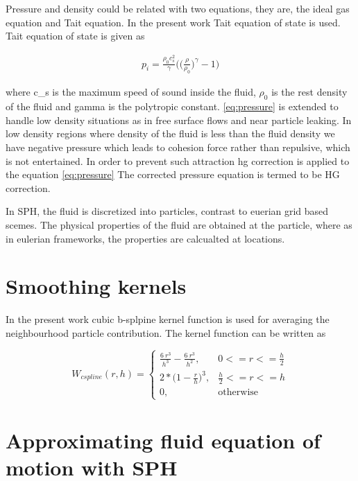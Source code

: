 Pressure and density could be related with two equations, they are, the ideal gas equation
and Tait equation. In the present work Tait equation of state is used. Tait equation of
state is given as

\begin{align}
  \label{eq:pressure}
  p_i = \frac{\rho_0 c_s^2 }{\gamma} \bigg(\bigg(\frac{\rho}{\rho_0}\bigg)^\gamma - 1 \bigg)
\end{align}

where c_s is the maximum speed of sound inside the fluid, $\rho_0$ is
the rest density of the fluid and gamma is the polytropic constant.
\eqref{eq:pressure} is extended to handle low density situations as in
free surface flows and near particle leaking. In low density regions
where density of the fluid is less than the fluid density we have
negative pressure which leads to cohesion force rather than repulsive,
which is not entertained. In order to prevent such attraction hg
correction is applied to the equation \eqref{eq:pressure} The corrected
pressure equation is termed to be HG correction.





In SPH, the fluid is discretized into particles, contrast to euerian
grid based scemes. The physical properties of the fluid are obtained
at the particle, where as in eulerian frameworks, the properties are
calcualted at locations.


\section{Smoothing kernels}
\label{sec:sk}


In the present work cubic b-splpine kernel function is used
for averaging the neighbourhood particle contribution. The kernel
function can be written as

\[
  W_{cspline}(r, h) =
  \begin{cases}
    \frac{6 \> r^3}{h^3} - \frac{6 \> r^3}{h^2}, & 0 <= r <= \frac{h}{2}\\
    2 * \big(1 - \frac{r}{h}\big)^3, & \frac{h}{2} <= r <= h\\
    0,                                          & \text{otherwise}
  \end{cases}
\]


\section{Approximating fluid equation of motion with SPH}
\label{sec:fesph}

